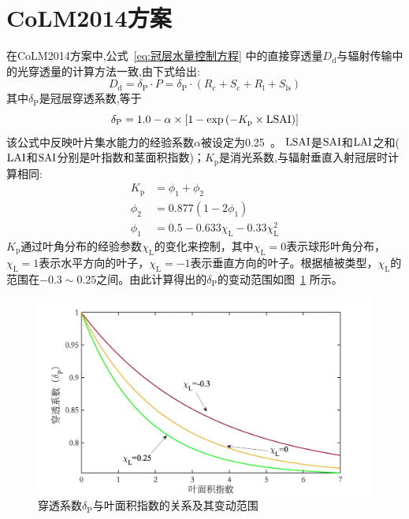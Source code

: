 \section{CoLM2014方案}
在CoLM2014方案中,公式~\eqref{eq:冠层水量控制方程} 中的直接穿透量$D_{\mathrm {d}} $与辐射传输中的光穿透量的计算方法一致,由下式给出:
\begin{equation}
  D_{\mathrm{d}}=\delta_{\mathrm{P}} \cdot P=\delta_{\mathrm{P}} \cdot\left(R_{\mathrm{c}}+S_{\mathrm{c}}+R_{\mathrm{l}}+S_{\mathrm{l s}}\right)
\end{equation}
其中$\delta_{\mathrm {P}} $是冠层穿透系数,等于
\begin{equation}
  \delta_{\mathrm{P}}=1.0-\alpha \times\left[1-\exp \left(-K_{\mathrm{p}} \times {\rm LSAI}\right)\right]
\end{equation}
该公式中反映叶片集水能力的经验系数$\alpha$被设定为0.25~\citep{lawrence2011parameterization}。
${\rm LSAI}$是${\rm SAI}$和${\rm LAI}$之和(${\rm LAI}$和${\rm SAI}$分别是叶指数和茎面积指数)；$K_{\mathrm {p}} $是消光系数,与辐射垂直入射冠层时计算相同:
\begin{equation}\label{eq:消光系数}
  \begin{aligned}
    K_{\mathrm{p}} &= \phi_{1}+\phi_{2} \\
    \phi_{2} &= 0.877\left(1-2 \phi_{1}\right) \\
    \phi_{1} &= 0.5-0.633 \chi_{\mathrm{L}}-0.33 \chi_{\mathrm{L}}^{2}
  \end{aligned}
\end{equation}
$K_{\mathrm {p}} $通过叶角分布的经验参数$\chi_{\mathrm {L}} $的变化来控制，其中$\chi_{\mathrm {L}} =0$表示球形叶角分布，$\chi_{\mathrm {L}} = 1$表示水平方向的叶子，$\chi_{\mathrm {L}} = -1$表示垂直方向的叶子。根据植被类型，$\chi_{\mathrm {L}} $的范围在$-0.3\sim0.25$之间。由此计算得出的$\delta_{\mathrm {P}} $的变动范围如图~\ref{fig:穿透系数与叶面积指数} 所示。
{
  \begin{figure}[htbp]
    \centering
    \includegraphics[width=1.0\textwidth]{Figures/陆地表面的水分循环/穿透系数与叶面积指数.jpg}
    \caption{穿透系数$\delta_{\mathrm {P}} $与叶面积指数的关系及其变动范围}
    \label{fig:穿透系数与叶面积指数}
  \end{figure}
}

